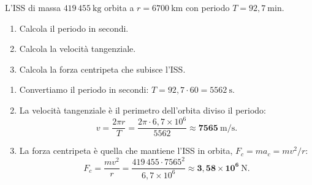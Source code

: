 \begin{question}[ID=1.2, subtitle={Stazione Spaziale Internazionale — velocità e forza centripeta}, tags={moto circolare, satellite}, difficulty=media]
L'ISS di massa $419\,455\ \mathrm{kg}$ orbita a $r = 6700\ \mathrm{km}$ con periodo $T = 92{,}7\ \mathrm{min}$.
\begin{enumerate}
\item Calcola il periodo in secondi.
\item Calcola la velocità tangenziale.
\item Calcola la forza centripeta che subisce l'ISS.
\end{enumerate}
\begin{solution}
\begin{enumerate}
\item Convertiamo il periodo in secondi: $T = 92{,}7\cdot 60 = 5562\ \mathrm{s}$.
\item La velocità tangenziale è il perimetro dell'orbita diviso il periodo:
\[
v = \frac{2\pi r}{T} = \frac{2\pi\cdot 6{,}7\times10^6}{5562} \approx \mathbf{7565\ \mathrm{m/s}}.
\]
\item La forza centripeta è quella che mantiene l'ISS in orbita, $F_c = m a_c = mv^2/r$:
\[
F_c = \frac{mv^2}{r} = \frac{419\,455\cdot 7565^2}{6{,}7\times10^6} \approx \mathbf{3{,}58\times10^6\ \mathrm{N}}.
\]
\end{enumerate}
\end{solution}
\end{question}


